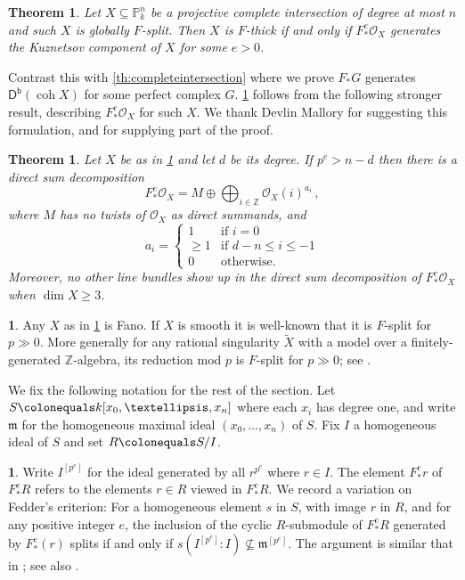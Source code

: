 \documentclass{amsart}
\newcommand{\coh}{\operatorname{coh}}
\newcommand{\dbcat}[1]{\cat{D}^{\mathsf{b}}(#1)}
\newcommand{\mco}{\mathcal{O}}
\newcommand{\fm}{\mathfrak{m}}
\newcommand{\cat}[1]{{\mathsf{#1}}}
\newtheorem{theorem}[subsection]{Theorem}
\theoremstyle{definition}
\newtheorem{chunk}[subsection]{}
\theoremstyle{remark}
\numberwithin{equation}{subsection}
\begin{document}
\begin{theorem}
\label{th:f_split_kuz_comp}
Let $X\subseteq \mathbb{P}^n_k$ be a projective complete intersection of degree at most $n$ and such $X$ is globally $F$-split. Then $X$ is $F$-thick if and only if $F_*^e \mco_X$ generates the Kuznetsov component of $X$ for some $e>0$.
\end{theorem}

Contrast this with \cref{th:completeintersection} where we prove $F_*G$ generates $\dbcat{\coh X}$ for some perfect complex $G$. \cref{th:f_split_kuz_comp} follows from the following stronger result, describing $ F_*^e \mco_X $ for such $X$. We thank Devlin Mallory for suggesting this formulation, and for supplying part of the proof.

\begin{theorem}
\label{th:f_split_sod}
Let $X$ be as in \cref{th:f_split_kuz_comp} and let $d$ be its degree. If $p^e> n-d$ then there is a direct sum decomposition 
\[
 F_*^e \mco_X = M\oplus \bigoplus_{i\in\mathbb{Z}}  \mco_X(i)^{a_i}\,,
\]
where $M$ has no twists of $\mco_X$ as direct summands, and 
\[
a_i= \begin{cases} 
1 & \text{if $i=0$} \\
\ge 1 & \text{if $d-n\le i\le -1$}\\
0 &\text{otherwise}.
\end{cases}
\]
Moreover, no other line bundles show up in the direct sum decomposition of $F_*^e\mco_X$ when $\dim X\ge 3$.
\end{theorem}

\begin{chunk}
 Any $X$ as in \cref{th:f_split_sod} is Fano. If $X$ is smooth it is well-known that it is $F$-split for $p \gg 0$. More generally for any rational singularity  $\tilde{X}$ with a model over a finitely-generated $\mathbb{Z}$-algebra,  its reduction mod $p$ is $F$-split for $p \gg 0$; see \cite{Smith:2000}.
\end{chunk}

We fix the following notation for the rest of the section. Let $S\colonequals k[x_0,\ldots,x_n]$ where each $x_i$ has degree one, and write $\fm$ for the homogeneous maximal ideal $(x_0,\ldots,x_n)$ of $S$. Fix $I$ a homogeneous ideal of $S$ and set $R\colonequals S/I$. 

\begin{chunk}
\label{lem:fedder_like_criterion}
Write $I^{[p^e]}$ for the ideal generated by all $r^{p^e}$ where $r\in I$. The element $F^e_*r$ of $F^e_*R$ refers to the elements $r \in R$ viewed in $F^e_*R$. We record a variation on Fedder's criterion: For a homogeneous element $s$ in $S$, with image $r$ in $R$, and  for any positive integer $e$, the inclusion of the cyclic $R$-submodule of $F_*^eR$ generated by $F_*^e (r)$ splits if and only if $s ( I^{[p^e]}:I) \not \subseteq \mathfrak{m}^{[p^e]}$.
The argument is similar that in \cite[Proposition~1.7]{Fedder:1983}; see also \cite{Glassbrenner:1996}.
\end{chunk}
\end{document}

